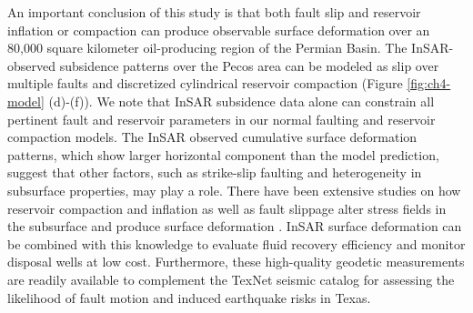 An important conclusion of this study is that both fault slip and reservoir inflation or compaction can produce observable surface deformation over an 80,000 square kilometer oil-producing region of the Permian Basin. The InSAR-observed subsidence patterns over the Pecos area can be modeled as slip over multiple faults and discretized cylindrical reservoir compaction (Figure \ref{fig:ch4-model} (d)-(f)). We note that InSAR subsidence data alone can constrain all pertinent fault and reservoir parameters in our normal faulting and reservoir compaction models. The InSAR observed cumulative surface deformation patterns, which show larger horizontal component than the model prediction, suggest that other factors, such as strike-slip faulting and heterogeneity in subsurface properties, may play a role. There have been extensive studies on how reservoir compaction and inflation as well as fault slippage alter stress fields in the subsurface and produce surface deformation \citep{Geertsma1973LandSubsidenceCompacting,Segall1992InducedStressesDue,Okada1992InternalDeformationDue,Du1992ComparisonVariousInversion,Vasco2005UseQuasiStatic,Vasco2008ReservoirMonitoringCharacterization,Khakim2012GeomechanicalModelingInsar}. InSAR surface deformation can be combined with this knowledge to evaluate fluid recovery efficiency and monitor disposal wells at low cost. Furthermore, these high-quality geodetic measurements are readily available to complement the TexNet seismic catalog for assessing the likelihood of fault motion and induced earthquake risks in Texas.


